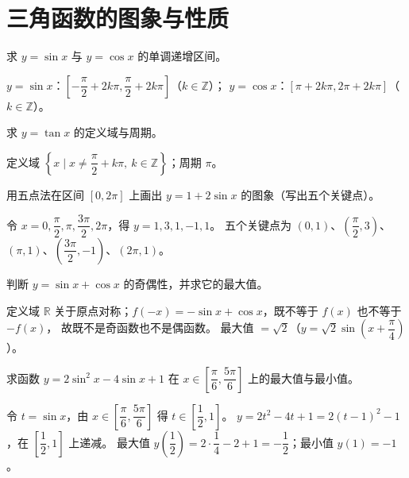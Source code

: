 \section{三角函数的图象与性质}

\begin{problem}
求 $y=\sin x$ 与 $y=\cos x$ 的单调递增区间。
\end{problem}
\begin{solution}
$y=\sin x$：$\left[-\dfrac{\pi}{2}+2k\pi,\dfrac{\pi}{2}+2k\pi\right]$（$k\in\mathbb{Z}$）；
$y=\cos x$：$[\pi+2k\pi,2\pi+2k\pi]$（$k\in\mathbb{Z}$）。
\end{solution}

\begin{problem}
求 $y=\tan x$ 的定义域与周期。
\end{problem}
\begin{solution}
定义域 $\left\{x\mid x\neq\dfrac{\pi}{2}+k\pi,\ k\in\mathbb{Z}\right\}$；周期 $\pi$。
\end{solution}

\begin{problem}
用五点法在区间 $[0,2\pi]$ 上画出 $y=1+2\sin x$ 的图象（写出五个关键点）。
\end{problem}
\begin{solution}
令 $x=0,\dfrac{\pi}{2},\pi,\dfrac{3\pi}{2},2\pi$，得 $y=1,3,1,-1,1$。
五个关键点为 $(0,1)$、$\left(\dfrac{\pi}{2},3\right)$、$(\pi,1)$、$\left(\dfrac{3\pi}{2},-1\right)$、$(2\pi,1)$。
\end{solution}

\begin{problem}
判断 $y=\sin x+\cos x$ 的奇偶性，并求它的最大值。
\end{problem}
\begin{solution}
定义域 $\mathbb{R}$ 关于原点对称；$f(-x)=-\sin x+\cos x$，既不等于 $f(x)$ 也不等于 $-f(x)$，
故既不是奇函数也不是偶函数。
最大值 $=\sqrt2$（$y=\sqrt2\sin\left(x+\dfrac{\pi}{4}\right)$）。
\end{solution}

\begin{problem}
求函数 $y=2\sin^2 x-4\sin x+1$ 在 $x\in\left[\dfrac{\pi}{6},\dfrac{5\pi}{6}\right]$ 上的最大值与最小值。
\end{problem}
\begin{solution}
令 $t=\sin x$，由 $x\in\left[\dfrac{\pi}{6},\dfrac{5\pi}{6}\right]$ 得 $t\in\left[\dfrac12,1\right]$。
$y=2t^2-4t+1=2(t-1)^2-1$，在 $\left[\dfrac12,1\right]$ 上递减。
最大值 $y\left(\dfrac12\right)=2\cdot\dfrac14-2+1=-\dfrac12$；最小值 $y(1)=-1$。
\end{solution}

